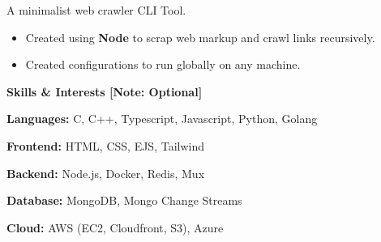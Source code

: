\documentclass[11pt]{article}
\begin{document}
A minimalist web crawler CLI Tool.

\begin{itemize}[noitemsep]
    
    \item Created using \textbf{Node} to scrap web markup and crawl links recursively.
    \item Created configurations to run globally on any machine.
\end{itemize}

\begin{center}
    \textbf{Skills \& Interests [Note: Optional]}
\end{center}

\textbf{Languages:} C, C++, Typescript, Javascript, Python, Golang

\textbf{Frontend:} HTML, CSS, EJS, Tailwind

\textbf{Backend:} Node.js, Docker, Redis, Mux

\textbf{Database:} MongoDB, Mongo Change Streams

\textbf{Cloud:} AWS (EC2, Cloudfront, S3), Azure
\end{document}
